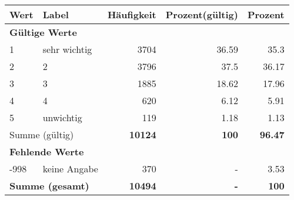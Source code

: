      \begin{longtable}{lXrrr}
     \toprule
     \textbf{Wert} & \textbf{Label} & \textbf{Häufigkeit} & \textbf{Prozent(gültig)} & \textbf{Prozent} \\
     \endhead
     \midrule
     \multicolumn{5}{l}{\textbf{Gültige Werte}}\\

     1 &
     \multicolumn{1}{X}{ sehr wichtig   } &


       \num{3704} &
       \num[round-mode=places,round-precision=2]{36,59} &
         \num[round-mode=places,round-precision=2]{35,3} \\

     2 &
     \multicolumn{1}{X}{ 2   } &


       \num{3796} &
       \num[round-mode=places,round-precision=2]{37,5} &
         \num[round-mode=places,round-precision=2]{36,17} \\

     3 &
     \multicolumn{1}{X}{ 3   } &


       \num{1885} &
       \num[round-mode=places,round-precision=2]{18,62} &
         \num[round-mode=places,round-precision=2]{17,96} \\

     4 &
     \multicolumn{1}{X}{ 4   } &


       \num{620} &
       \num[round-mode=places,round-precision=2]{6,12} &
         \num[round-mode=places,round-precision=2]{5,91} \\

     5 &
     \multicolumn{1}{X}{ unwichtig   } &


       \num{119} &
       \num[round-mode=places,round-precision=2]{1,18} &
         \num[round-mode=places,round-precision=2]{1,13} \\
     \midrule
     \multicolumn{2}{l}{Summe (gültig)} &
       \textbf{\num{10124}} &
     \textbf{100} &
       \textbf{\num[round-mode=places,round-precision=2]{96,47}} \\
     \multicolumn{5}{l}{\textbf{Fehlende Werte}}\\
       -998 &
       keine Angabe &
         \num{370} &
        - &
         \num[round-mode=places,round-precision=2]{3,53} \\
     \midrule
     \multicolumn{2}{l}{\textbf{Summe (gesamt)}} &
          \textbf{\num{10494}} &
        \textbf{-} &
        \textbf{100} \\
     \bottomrule
     \end{longtable}
     
